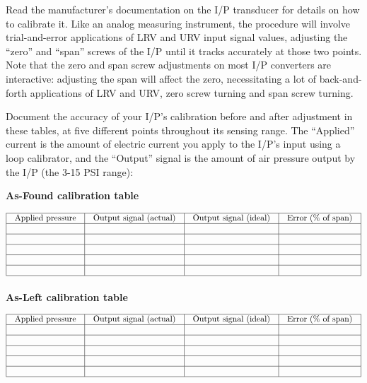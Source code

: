 Read the manufacturer's documentation on the I/P transducer for details on how to calibrate it.  Like an analog measuring instrument, the procedure will involve trial-and-error applications of LRV and URV input signal values, adjusting the ``zero'' and ``span'' screws of the I/P until it tracks accurately at those two points.  Note that the zero and span screw adjustments on most I/P converters are interactive: adjusting the span will affect the zero, necessitating a lot of back-and-forth applications of LRV and URV, zero screw turning and span screw turning.

\filbreak

Document the accuracy of your I/P's calibration before and after adjustment in these tables, at five different points throughout its sensing range.  The ``Applied'' current is the amount of electric current you apply to the I/P's input using a loop calibrator, and the ``Output'' signal is the amount of air pressure output by the I/P (the 3-15 PSI range):

\vskip 10pt

{\bf As-Found calibration table}


$$\vbox{\offinterlineskip
\halign{\strut
\vrule \quad\hfil # \ \hfil & 
\vrule \quad\hfil # \ \hfil & 
\vrule \quad\hfil # \ \hfil & 
\vrule \quad\hfil # \ \hfil \vrule \cr
\noalign{\hrule}
%
Applied pressure & Output signal (actual) & Output signal (ideal) & Error (\% of span) \cr
%
\noalign{\hrule}
%
 &  &  & \cr
%
\noalign{\hrule}
%
 &  &  & \cr
%
\noalign{\hrule}
%
 &  &  & \cr
%
\noalign{\hrule}
%
 &  &  & \cr
%
\noalign{\hrule}
%
 &  &  & \cr
%
\noalign{\hrule}
} %
}$$ %

\vskip 10pt

{\bf As-Left calibration table}


$$\vbox{\offinterlineskip
\halign{\strut
\vrule \quad\hfil # \ \hfil & 
\vrule \quad\hfil # \ \hfil & 
\vrule \quad\hfil # \ \hfil & 
\vrule \quad\hfil # \ \hfil \vrule \cr
\noalign{\hrule}
%
Applied pressure & Output signal (actual) & Output signal (ideal) & Error (\% of span) \cr
%
\noalign{\hrule}
%
 &  &  & \cr
%
\noalign{\hrule}
%
 &  &  & \cr
%
\noalign{\hrule}
%
 &  &  & \cr
%
\noalign{\hrule}
%
 &  &  & \cr
%
\noalign{\hrule}
%
 &  &  & \cr
%
\noalign{\hrule}
} %
}$$ %

